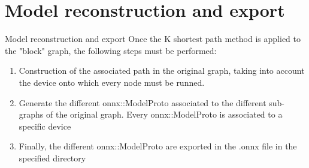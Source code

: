 \section{Model reconstruction and export}

\begin{frame}[plain]{}
    \sectionpage
\end{frame}

\begin{frame}{Model reconstruction and export}
    Once the K shortest path method is applied to the "block" graph, the following steps must be performed:
\begin{enumerate}
    \item Construction of the associated path in the original graph, taking into account the device onto which every node must be runned. 
    \item Generate the different onnx::ModelProto associated to the different sub-graphs of the original graph. Every onnx::ModelProto is associated to a specific device
    \item Finally, the different onnx::ModelProto are exported in the .onnx file in the specified directory
\end{enumerate}

\end{frame}